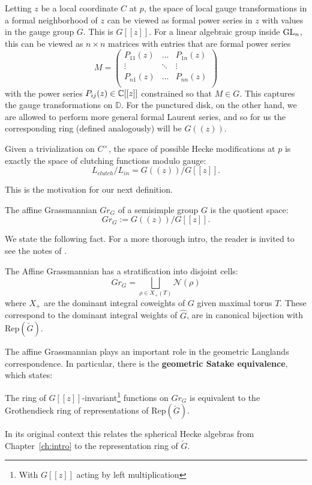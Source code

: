 	Letting $z$ be a local coordinate $C$ at $p$, the space of local gauge transformations in a formal neighborhood of $z$ can be viewed as formal power series in $z$ with values in the gauge group $G$. This is $G[[z]]$. For a linear algebraic group inside $\mathrm{GL}_n$, this can be viewed as $n\times n$ matrices with entries that are formal power series
	\[
		M = \begin{pmatrix}
			P_{11}(z) & \dots & P_{1n}(z)\\
			\vdots & \ddots & \vdots\\
			P_{n1}(z) & \dots & P_{nn}(z)\\
		\end{pmatrix}
	\]
	with the power series $P_{ij}(z) \in \mathbb{C}[[z]]$ constrained so that $M \in G$. This captures the gauge transformations on $\mathbb D$. For the punctured disk, on the other hand, we are allowed to perform more general formal Laurent series, and so for us the corresponding ring (defined analogously) will be $G((z))$. 
	
	
	Given a trivialization on $C^\times$, the space of possible Hecke modifications at $p$ is exactly the space of clutching functions modulo gauge:
	\[
		L_{clutch} / L_{in} = G((z))/G[[z]].
	\]
	
	This is the motivation for our next definition.
	\begin{defn}
		The affine Grassmannian $Gr_G$ of a semisimple group $G$ is the quotient space:
		\[
			Gr_G := G((z))/G[[z]].
		\]
	\end{defn}
	\noindent We state the following fact. For a more thorough intro, the reader is invited to see the notes of \cite{zhu2016}.
	\begin{fact}
		The Affine Grassmannian has a stratification into disjoint cells:
		\begin{equation}
			Gr_G = \bigsqcup_{\rho \in X_+(T)} \mathcal N(\rho)
		\end{equation}
		where $X_+$ are the dominant integral coweights of $G$ given maximal torus $T$. These correspond to the dominant integral weights of $\hat G$, are in canonical bijection with $\mathrm{Rep}(\check G)$.
	\end{fact}
	
	The affine Grassmannian plays an important role in the geometric Langlands correspondence. In particular, there is the \textbf{geometric Satake equivalence}, which states:
	\begin{theorem}
		The ring of $G[[z]]$-invariant\footnote{With $G[[z]]$ acting by left multiplication} functions on $Gr_G$ is equivalent to the Grothendieck ring of representations of $\mathrm{Rep}(\check G)$.
	\end{theorem}
	In its original context \cite{satake1963} this relates the spherical Hecke algebras from Chapter~\ref{ch:intro} to the representation ring of $\check G$.
		
